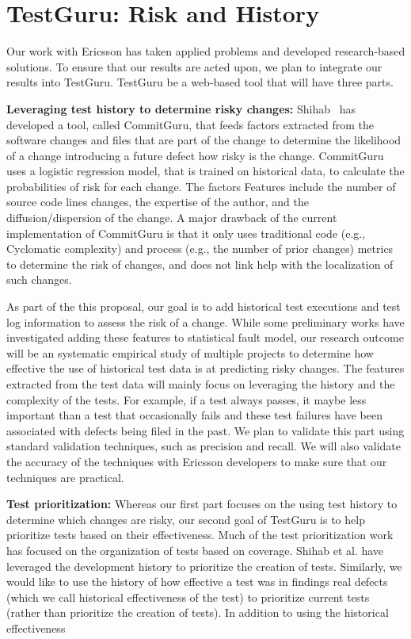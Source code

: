 \section{TestGuru: Risk and History}

Our work with Ericsson has taken applied problems and developed research-based solutions. To ensure that our results are acted upon, we plan to integrate our results into TestGuru. TestGuru be a web-based tool that will have three parts. 

\textbf{Leveraging test history to determine risky changes:} Shihab~\cite{} has developed a tool, called CommitGuru, that feeds factors extracted from the software changes and files that are part of the change to determine the likelihood of a change introducing a future defect \ie how risky is the change. CommitGuru uses a logistic regression model, that is trained on historical data, to calculate the probabilities of risk for each change. The factors Features include the number of source code lines changes, the expertise of the author, and the diffusion/dispersion of the change. A major drawback of the current implementation of CommitGuru is that it only uses traditional code (e.g., Cyclomatic complexity) and process (e.g., the number of prior changes) metrics to determine the risk of changes, and does not link help with the localization of such changes.

As part of the this proposal, our goal is to add historical test executions and test log information to assess the risk of a change. While some preliminary works have investigated adding these features to statistical fault model\cite{herzig,others}, our research outcome will be an systematic empirical study of multiple projects to determine how effective the use of historical test data is at predicting risky changes. The features extracted from the test data will mainly focus on leveraging the history and the complexity of the tests. For example, if a test always passes, it maybe less important than a test that occasionally fails and these test failures have been associated with defects being filed in the past. We plan to validate this part using standard validation techniques, such as precision and recall. We will also validate the accuracy of the techniques with Ericsson developers to make sure that our techniques are practical.

\textbf{Test prioritization:} Whereas our first part focuses on the using test history to determine which changes are risky, our second goal of TestGuru is to help prioritize tests based on their effectiveness. Much of the test prioritization work  has focused on the organization of tests based on coverage.  Shihab et al. have leveraged the development history to prioritize the creation of tests. Similarly, we would like to use the history of how effective a test was in findings real defects (which we call historical effectiveness of the test) to prioritize current tests (rather than prioritize the creation of tests). In addition to using the historical effectiveness 

